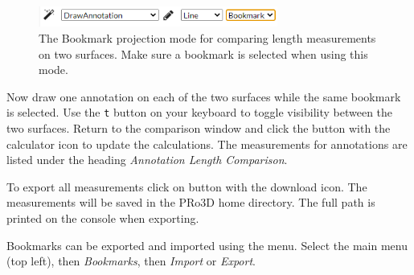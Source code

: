 \begin{figure}[h]
	\centering
	\includegraphics[width=0.7\textwidth]{pics/surfaceComparisonBookmarkMode.PNG}
	\caption[The Bookmark Projection Mode.]{The Bookmark projection mode for comparing length measurements on two surfaces. Make sure a bookmark is selected when using this mode.}
	\label{fig:surfaceComparisonBookmarkMode}
\end{figure}

Now draw one annotation on each of the two surfaces while the same bookmark is selected. Use the \texttt{t} button on your keyboard to toggle visibility between the two surfaces. Return to the comparison window and click the button with the calculator icon to update the calculations. The measurements for annotations are listed under the heading \emph{Annotation Length Comparison}.

To export all measurements click on button with the download icon. The measurements will be saved in the PRo3D home directory. The full path is printed on the console when exporting.

Bookmarks can be exported and imported using the menu. Select the main menu (top left), then \emph{Bookmarks}, then \emph{Import} or \emph{Export}.